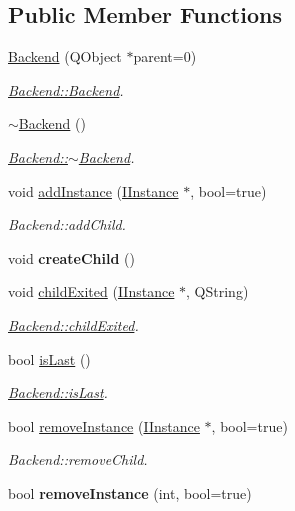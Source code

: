 \subsection*{Public Member Functions}
\begin{DoxyCompactItemize}
\item 
\hyperlink{classBackend_a57e21c0be0119a102f8ae27db6ac3106}{Backend} (Q\+Object $\ast$parent=0)
\begin{DoxyCompactList}\small\item\em \hyperlink{classBackend_a57e21c0be0119a102f8ae27db6ac3106}{Backend\+::\+Backend}. \end{DoxyCompactList}\item 
\hyperlink{classBackend_ad4a4bc528854a918880d5e6b5de05cc6}{$\sim$\+Backend} ()
\begin{DoxyCompactList}\small\item\em \hyperlink{classBackend_ad4a4bc528854a918880d5e6b5de05cc6}{Backend\+::$\sim$\+Backend}. \end{DoxyCompactList}\item 
void \hyperlink{classBackend_af5d23c3090d7b3643ed0df364ddfb70c}{add\+Instance} (\hyperlink{classInstances_1_1IInstance}{I\+Instance} $\ast$, bool=true)
\begin{DoxyCompactList}\small\item\em Backend\+::add\+Child. \end{DoxyCompactList}\item 
\hypertarget{classBackend_af3add13d84efb30e198cd6ce08204696}{void {\bfseries create\+Child} ()}\label{classBackend_af3add13d84efb30e198cd6ce08204696}

\item 
void \hyperlink{classBackend_a85c891e4026d4597adb6462488be3d2e}{child\+Exited} (\hyperlink{classInstances_1_1IInstance}{I\+Instance} $\ast$, Q\+String)
\begin{DoxyCompactList}\small\item\em \hyperlink{classBackend_a85c891e4026d4597adb6462488be3d2e}{Backend\+::child\+Exited}. \end{DoxyCompactList}\item 
bool \hyperlink{classBackend_a648433115e8e2a94e9084628f408465a}{is\+Last} ()
\begin{DoxyCompactList}\small\item\em \hyperlink{classBackend_a648433115e8e2a94e9084628f408465a}{Backend\+::is\+Last}. \end{DoxyCompactList}\item 
bool \hyperlink{classBackend_a390eb82dfe8025c1f31ddacc8a25f801}{remove\+Instance} (\hyperlink{classInstances_1_1IInstance}{I\+Instance} $\ast$, bool=true)
\begin{DoxyCompactList}\small\item\em Backend\+::remove\+Child. \end{DoxyCompactList}\item 
\hypertarget{classBackend_af8ce743855e7241ebf43d2c7527d9a72}{bool {\bfseries remove\+Instance} (int, bool=true)}\label{classBackend_af8ce743855e7241ebf43d2c7527d9a72}


\end{DoxyCompactItemize}
